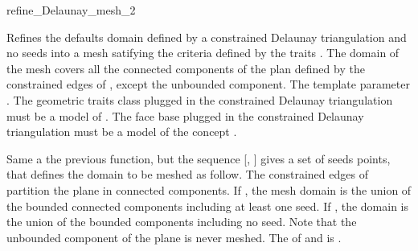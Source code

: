\begin{ccRefFunction}{refine_Delaunay_mesh_2}


{ Refines the defaults domain defined by a constrained Delaunay
  triangulation and no seeds into a mesh satifying the criteria
  defined by the traits . The domain of the mesh
    covers all the connected components of the plan defined by the
    constrained edges of , except the unbounded component.
  \ccPrecond The template parameter 
    \meshcdtrequires{}. The geometric traits class plugged in the
    constrained Delaunay triangulation must be a model of
    . The face base plugged in the
    constrained Delaunay triangulation must be a model of the
    concept .}

                     { Same a the previous function, but the sequence
                       [, ] gives a set of
                       seeds points, that defines the domain to be
                       meshed as follow. The constrained edges of
                        partition the plane in connected
                       components. If , the mesh domain
                       is the union of the bounded connected
                       components including at least one seed. If
                       , the domain is the union of
                       the bounded components including no seed. Note
                       that the unbounded component of the plane is
                       never meshed.
                       \ccPrecond The  of 
                       and  is
                       .}

\end{ccRefFunction}

